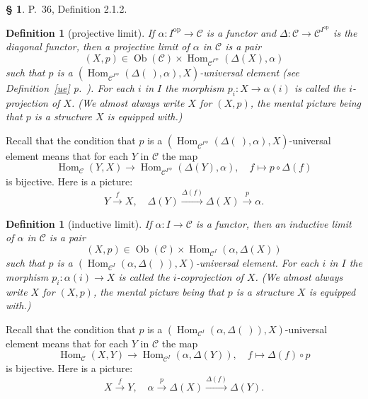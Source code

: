\documentclass[12pt]{article}
\newtheorem{df}[thm]{Definition}
\theoremstyle{remark}
\theoremstyle{definition}
\newtheorem{s}[thm]{\S}
\newcommand{\C}{\mathcal C}
\newcommand{\xr}{\xrightarrow}
\DeclareMathOperator{\Hom}{Hom}
\DeclareMathOperator{\Ob}{Ob}
\DeclareMathOperator{\op}{op}
\begin{document}
\begin{s}\label{212}
P.~36, Definition 2.1.2. 

\begin{df}[projective limit]\label{p}
If $\alpha:I^{\op}\to\C$ is a functor and $\Delta:\C\to\C^{I^{\op}}$ is the diagonal functor, then a {\em projective limit of} $\alpha$ {\em in} $\C$ is a pair 
$$
(X,p)\in\Ob(\C)\times\Hom_{\C^{I^{\op}}}(\Delta(X),\alpha)
$$
such that $p$ is a $(\Hom_{\C^{I^{\op}}}(\Delta(\ ),\alpha),X)$\--universal element (see Definition~\ref{ue} p.~\pageref{ue}). For each $i$ in $I$ the morphism $p_i:X\to\alpha(i)$ is called the $i$-{\em projection} of $X$. (We almost always write $X$ for $(X,p)$, the mental picture being that $p$ is a structure $X$ is equipped with.)
\end{df}

Recall that the condition that $p$ is a $(\Hom_{\C^{I^{\op}}}(\Delta(\ ),\alpha),X)$\--universal element means that for each $Y$ in $\C$ the map 
$$
\Hom_\C(Y,X)\to\Hom_{\C^{I^{\op}}}(\Delta(Y),\alpha),\quad f\mapsto p\circ\Delta(f)
$$ 
is bijective. Here is a picture:
$$
Y\xr fX,\quad\Delta(Y)\xr{\Delta(f)}\Delta(X)\xr{p}\alpha.
$$

\begin{df}[inductive limit] 
If $\alpha:I\to\C$ is a functor, then an {\em inductive limit} of $\alpha$ {\em in} $\C$ is a pair 
$$
(X,p)\in\Ob(\C)\times\Hom_{\C^I}(\alpha,\Delta(X))
$$
such that $p$ is a $(\Hom_{\C^I}(\alpha,\Delta(\ )),X)$\--universal element. For each $i$ in $I$ the morphism $p_i:\alpha(i)\to X$ is called the $i$-{\em coprojection} of $X$. (We almost always write $X$ for $(X,p)$, the mental picture being that $p$ is a structure $X$ is equipped with.)
\end{df}

Recall that the condition that $p$ is a $(\Hom_{\C^I}(\alpha,\Delta(\ )),X)$\--universal element means that for each $Y$ in $\C$ the map 
\begin{equation}\label{cue}
\Hom_\C(X,Y)\to\Hom_{\C^I}(\alpha,\Delta(Y)),\quad f\mapsto\Delta(f)\circ p
\end{equation}
is bijective. Here is a picture:
$$
X\xr fY,\quad\alpha\xr{p}\Delta(X)\xr{\Delta(f)}\Delta(Y).
$$
\end{s}

%
\end{document}
